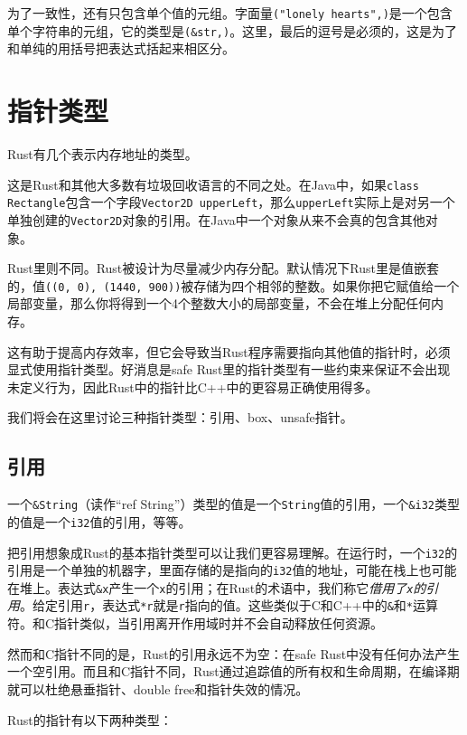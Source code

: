 为了一致性，还有只包含单个值的元组。字面量\texttt{("lonely hearts",)}是一个包含单个字符串的元组，它的类型是\texttt{(\&str,)}。这里，最后的逗号是必须的，这是为了和单纯的用括号把表达式括起来相区分。

\section{指针类型}
Rust有几个表示内存地址的类型。

这是Rust和其他大多数有垃圾回收语言的不同之处。在Java中，如果\texttt{class Rectangle}包含一个字段\texttt{Vector2D upperLeft}，那么\texttt{upperLeft}实际上是对另一个单独创建的\texttt{Vector2D}对象的引用。在Java中一个对象从来不会真的包含其他对象。

Rust里则不同。Rust被设计为尽量减少内存分配。默认情况下Rust里是值嵌套的，值\texttt{((0, 0), (1440, 900))}被存储为四个相邻的整数。如果你把它赋值给一个局部变量，那么你将得到一个4个整数大小的局部变量，不会在堆上分配任何内存。

这有助于提高内存效率，但它会导致当Rust程序需要指向其他值的指针时，必须显式使用指针类型。好消息是safe Rust里的指针类型有一些约束来保证不会出现未定义行为，因此Rust中的指针比C++中的更容易正确使用得多。

我们将会在这里讨论三种指针类型：引用、box、unsafe指针。

\subsection{引用}

一个\texttt{\&String}（读作“ref String”）类型的值是一个\texttt{String}值的引用，一个\texttt{\&i32}类型的值是一个\texttt{i32}值的引用，等等。

把引用想象成Rust的基本指针类型可以让我们更容易理解。在运行时，一个\texttt{i32}的引用是一个单独的机器字，里面存储的是指向的\texttt{i32}值的地址，可能在栈上也可能在堆上。表达式\texttt{\&x}产生一个\texttt{x}的引用；在Rust的术语中，我们称它\emph{借用了\texttt{x}的引用}。给定引用\texttt{r}，表达式\texttt{*r}就是\texttt{r}指向的值。这些类似于C和C++中的\texttt{\&}和\texttt{*}运算符。和C指针类似，当引用离开作用域时并不会自动释放任何资源。

然而和C指针不同的是，Rust的引用永远不为空：在safe Rust中没有任何办法产生一个空引用。而且和C指针不同，Rust通过追踪值的所有权和生命周期，在编译期就可以杜绝悬垂指针、double free和指针失效的情况。

Rust的指针有以下两种类型：


